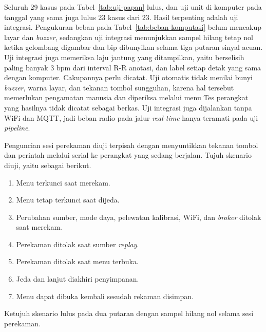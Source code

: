 Seluruh 29 kasus pada Tabel~\ref{tab:uji-papan} lulus, dan uji unit di komputer pada tanggal yang sama juga lulus 23 kasus dari 23. Hasil terpenting adalah uji integrasi. Pengukuran beban pada Tabel~\ref{tab:beban-komputasi} belum mencakup layar dan \textit{buzzer}, sedangkan uji integrasi menunjukkan sampel hilang tetap nol ketika gelombang digambar dan bip dibunyikan selama tiga putaran sinyal acuan. Uji integrasi juga memeriksa laju jantung yang ditampilkan, yaitu berselisih paling banyak 3 bpm dari interval R-R anotasi, dan label setiap detak yang sama dengan komputer. Cakupannya perlu dicatat. Uji otomatis tidak menilai bunyi \textit{buzzer}, warna layar, dan tekanan tombol sungguhan, karena hal tersebut memerlukan pengamatan manusia dan diperiksa melalui menu Tes perangkat yang hasilnya tidak dicatat sebagai berkas. Uji integrasi juga dijalankan tanpa WiFi dan MQTT, jadi beban radio pada jalur \textit{real-time} hanya teramati pada uji \textit{pipeline}.

Penguncian sesi perekaman diuji terpisah dengan menyuntikkan tekanan tombol dan perintah melalui serial ke perangkat yang sedang berjalan. Tujuh skenario diuji, yaitu sebagai berikut.
\begin{enumerate}
  \item Menu terkunci saat merekam.
  \item Menu tetap terkunci saat dijeda.
  \item Perubahan sumber, mode daya, pelewatan kalibrasi, WiFi, dan \textit{broker} ditolak saat merekam.
  \item Perekaman ditolak saat sumber \textit{replay}.
  \item Perekaman ditolak saat menu terbuka.
  \item Jeda dan lanjut diakhiri penyimpanan.
  \item Menu dapat dibuka kembali sesudah rekaman disimpan.
\end{enumerate}
Ketujuh skenario lulus pada dua putaran dengan sampel hilang nol selama sesi perekaman.

